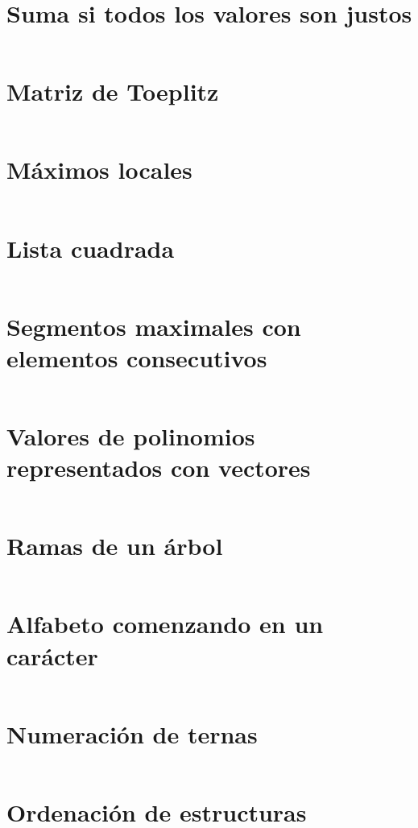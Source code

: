 \documentclass[a4paper,12pt,twoside]{book}
\newcommand{\ejercicio}[1]{\inputminted[firstline=7]{haskell}{../src/#1.hs}}
\begin{document}
\chapter{Suma si todos los valores son justos}
\ejercicio{Suma_si_todos_justos}

\chapter{Matriz de Toeplitz}
\ejercicio{Matriz_Toeplitz}

\chapter{Máximos locales}
\ejercicio{Maximos_locales}

\chapter{Lista cuadrada}
\ejercicio{Lista_cuadrada}

\chapter{Segmentos maximales con elementos consecutivos}
\ejercicio{Segmentos_consecutivos}

\chapter{Valores de polinomios representados con vectores}
\ejercicio{Valor_de_un_polinomio}

\chapter{Ramas de un árbol}
\ejercicio{Ramas_de_un_arbol}

\chapter{Alfabeto comenzando en un carácter}
\ejercicio{Alfabeto_desde}

\chapter{Numeración de ternas}
\ejercicio{Numeracion_de_ternas}

\chapter{Ordenación de estructuras}
\ejercicio{Ordenacion_de_estructuras}
\end{document}
